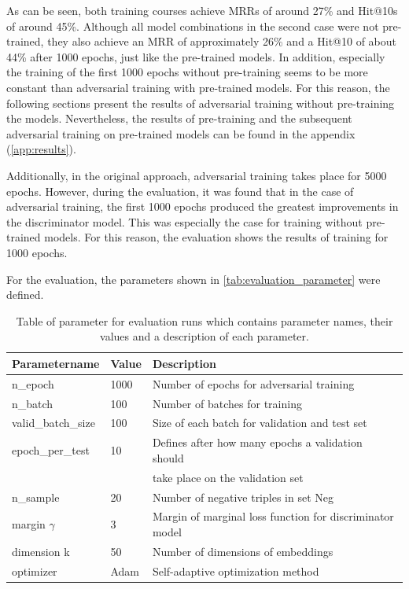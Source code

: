 As can be seen, both training courses achieve MRRs of around 27\% and Hit@10s of around 45\%.
Although all model combinations in the second case were not pre-trained, they also achieve an MRR of approximately 26\% and a Hit@10 of about 44\% after 1000 epochs, just like the pre-trained models.
In addition, especially the training of the first 1000 epochs without pre-training seems to be more constant than adversarial training with pre-trained models.
For this reason, the following sections present the results of adversarial training without pre-training the models.
Nevertheless, the results of pre-training and the subsequent adversarial training on pre-trained models can be found in the appendix (\autoref{app:results}).

Additionally, in the original approach, adversarial training takes place for 5000 epochs.
However, during the evaluation, it was found that in the case of adversarial training, the first 1000 epochs produced the greatest improvements in the discriminator model.
This was especially the case for training without pre-trained models.
For this reason, the evaluation shows the results of training for 1000 epochs.

For the evaluation, the parameters shown in \autoref{tab:evaluation_parameter} were defined.
\begin{table}[h]
    \centering
    \begin{tabular}{lll}
        \toprule
        
        \textbf{Parametername} & 
        \textbf{Value} & 
        \textbf{Description} \\
    
        \midrule
         n\_epoch & 1000 & Number of epochs for adversarial training\\
         n\_batch & 100 & Number of batches for training \\
         
         valid\_batch\_size & 100 & Size of each batch for validation and test set\\
         epoch\_per\_test & 10 & Defines after how many epochs a validation should \\
         &  & take place on the validation set \\
         n\_sample & 20 & Number of negative triples in set Neg \\

        margin $\gamma$ & 3 & Margin of marginal loss function for discriminator model\\
        dimension k & 50 & Number of dimensions of embeddings \\ 
        optimizer & Adam & Self-adaptive optimization method \\

        \bottomrule
    \end{tabular}
    \caption{Table of parameter for evaluation runs which contains parameter names, their values and a description of each parameter.}
\label{tab:evaluation_parameter}
\end{table}
\clearpage